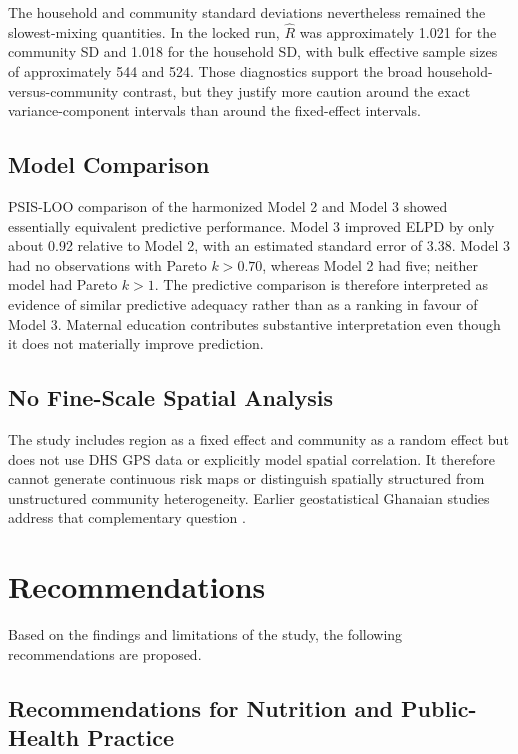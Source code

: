 The household and community standard deviations nevertheless remained the slowest-mixing quantities. In the locked run, $\hat R$ was approximately 1.021 for the community SD and 1.018 for the household SD, with bulk effective sample sizes of approximately 544 and 524. Those diagnostics support the broad household-versus-community contrast, but they justify more caution around the exact variance-component intervals than around the fixed-effect intervals.

\subsection{Model Comparison}

PSIS-LOO comparison of the harmonized Model 2 and Model 3 showed essentially equivalent predictive performance. Model 3 improved ELPD by only about 0.92 relative to Model 2, with an estimated standard error of 3.38. Model 3 had no observations with Pareto $k>0.70$, whereas Model 2 had five; neither model had Pareto $k>1$. The predictive comparison is therefore interpreted as evidence of similar predictive adequacy rather than as a ranking in favour of Model 3. Maternal education contributes substantive interpretation even though it does not materially improve prediction.

\subsection{No Fine-Scale Spatial Analysis}

The study includes region as a fixed effect and community as a random effect but does not use DHS GPS data or explicitly model spatial correlation. It therefore cannot generate continuous risk maps or distinguish spatially structured from unstructured community heterogeneity. Earlier geostatistical Ghanaian studies address that complementary question \citep{AhetoDagne2021,AmoakoJohnson2022}.

\section{Recommendations}

Based on the findings and limitations of the study, the following recommendations are proposed.

\subsection{Recommendations for Nutrition and Public-Health Practice}

